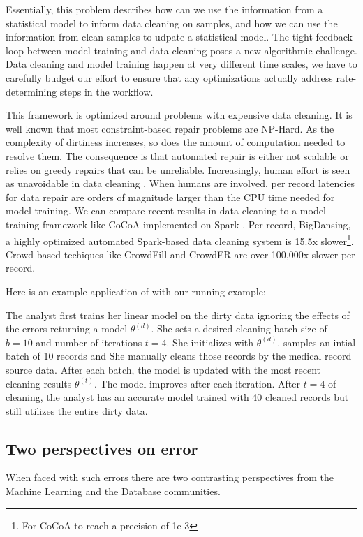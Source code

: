 Essentially, this problem describes how can we use the information from a statistical model to inform data cleaning on samples, and how we can use the information from clean samples to udpate a statistical model.
The tight feedback loop between model training and data cleaning poses a new algorithmic challenge. 
Data cleaning and model training happen at very different time scales, we have to carefully budget our effort to ensure that any optimizations actually address rate-determining steps in the workflow.

This framework is optimized around problems with expensive data cleaning.
It is well known that most constraint-based repair problems are NP-Hard.
As the complexity of dirtiness increases, so does the amount of computation needed to resolve them.
The consequence is that automated repair is either not scalable or relies on greedy repairs that can be unreliable.
Increasingly, human effort is seen as unavoidable in data cleaning \cite{park2014crowdfill, wang2012crowder, gokhale2014corleone, wang1999sample}.
When humans are involved, per record latencies for data repair are orders of magnitude larger than the CPU time needed for model training.
We can compare recent results in data cleaning to a model training framework like CoCoA implemented on Spark \cite{jaggi2014communication}.
Per record, BigDansing, a highly optimized automated Spark-based data cleaning system is 15.5x slower\footnote{For CoCoA to reach a precision of 1e-3}.
Crowd based techiques like CrowdFill \cite{park2014crowdfill} and CrowdER \cite{wang2012crowder} are over 100,000x slower per record.

\noindent Here is an example application of \sys with our running example:
\begin{example}
The analyst first trains her linear model on the dirty data ignoring the effects of the errors returning a model $\theta^{(d)}$.
She sets a desired cleaning batch size of $b=10$ and number of iterations $t=4$.
She initializes \sys with $\theta^{(d)}$.
\sys samples an intial batch of 10 records and 
She manually cleans those records by the medical record source data.
After each batch, the model is updated with the most recent cleaning results $\theta^{(t)}$.
The model improves after each iteration.
After $t=4$ of cleaning, the analyst has an accurate model trained with 40 cleaned records but still utilizes the entire dirty data.
\end{example}

\iffalse

\subsection{Two perspectives on error}
When faced with such errors there are two contrasting perspectives from the Machine Learning and the Database communities.

